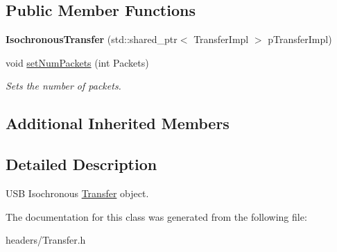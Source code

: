 \subsection*{Public Member Functions}
\begin{DoxyCompactItemize}
\item 
\hypertarget{class_lib_u_s_b_1_1_isochronous_transfer_a1b5761f6dd930b29eba85b8088d29e82}{{\bfseries Isochronous\-Transfer} (std\-::shared\-\_\-ptr$<$ Transfer\-Impl $>$ p\-Transfer\-Impl)}\label{class_lib_u_s_b_1_1_isochronous_transfer_a1b5761f6dd930b29eba85b8088d29e82}

\item 
\hypertarget{class_lib_u_s_b_1_1_isochronous_transfer_a97399b533b68a340b31b690571ce57fa}{void \hyperlink{class_lib_u_s_b_1_1_isochronous_transfer_a97399b533b68a340b31b690571ce57fa}{set\-Num\-Packets} (int Packets)}\label{class_lib_u_s_b_1_1_isochronous_transfer_a97399b533b68a340b31b690571ce57fa}

\begin{DoxyCompactList}\small\item\em Sets the number of packets. \end{DoxyCompactList}\end{DoxyCompactItemize}
\subsection*{Additional Inherited Members}


\subsection{Detailed Description}
U\-S\-B Isochronous \hyperlink{class_lib_u_s_b_1_1_transfer}{Transfer} object. 

The documentation for this class was generated from the following file\-:\begin{DoxyCompactItemize}
\item 
headers/Transfer.\-h\end{DoxyCompactItemize}
